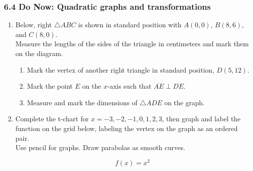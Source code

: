 \documentclass[12pt, twoside]{article}
\begin{document}
\subsubsection*{6.4 Do Now: Quadratic graphs and transformations}
  \begin{enumerate}

    \item Below, right $\triangle ABC$ is shown in standard position with $A(0, 0)$, $B(8, 6)$, and $C(8,0)$.\\[0.25cm]
     Measure the lengths of the sides of the triangle in centimeters and mark them on the diagram.
    \begin{center}
    \end{center}
      \vspace{1cm}
    \begin{enumerate}
      \item Mark the vertex of another right triangle in standard position, $D(5,12)$.
      \item Mark the point $E$ on the $x$-axis such that $\overline{AE} \perp \overline{DE}$.
      \item Measure and mark the dimensions of $\triangle ADE$ on the graph.
    \end{enumerate}

\newpage 
  \item Complete the t-chart for $x= -3,-2,-1,0,1,2,3$, then graph and label the function on the grid below, labeling the vertex on the graph as an ordered pair.\\[0.25cm]
  Use pencil for graphs. Draw parabolas as smooth curves.

  \[f(x) = x^2\]


\end{enumerate}
\end{document}
